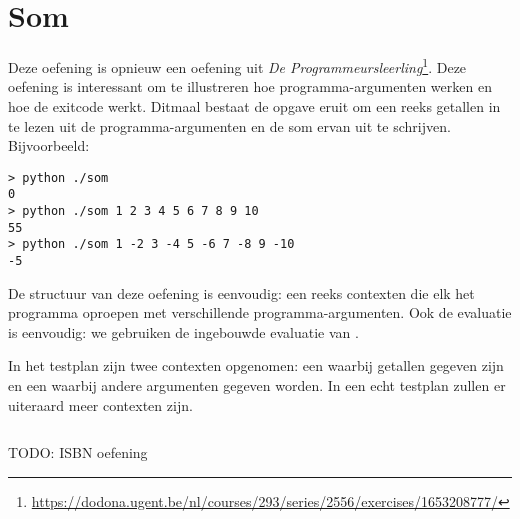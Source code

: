 \inputminted{json}{sources/division-plan.tson}

\section{Som}\label{sec:oefeningen-som}

Deze oefening is opnieuw een oefening uit \emph{De Programmeursleerling}\footnote{\url{https://dodona.ugent.be/nl/courses/293/series/2556/exercises/1653208777/}}.
Deze oefening is interessant om te illustreren hoe programma-argumenten werken en hoe de exitcode werkt.
Ditmaal bestaat de opgave eruit om een reeks getallen in te lezen uit de programma-argumenten en de som ervan uit te schrijven.
Bijvoorbeeld:

\begin{verbatim}
> python ./som
0
> python ./som 1 2 3 4 5 6 7 8 9 10
55
> python ./som 1 -2 3 -4 5 -6 7 -8 9 -10
-5
\end{verbatim}

De structuur van deze oefening is eenvoudig: een reeks contexten die elk het programma oproepen met verschillende programma-argumenten.
Ook de evaluatie is eenvoudig: we gebruiken de ingebouwde evaluatie van \tested{}.

In het testplan zijn twee contexten opgenomen: een waarbij getallen gegeven zijn en een waarbij andere argumenten gegeven worden.
In een echt testplan zullen er uiteraard meer contexten zijn.

\inputminted{json}{sources/sum-plan.tson}

TODO: ISBN oefening